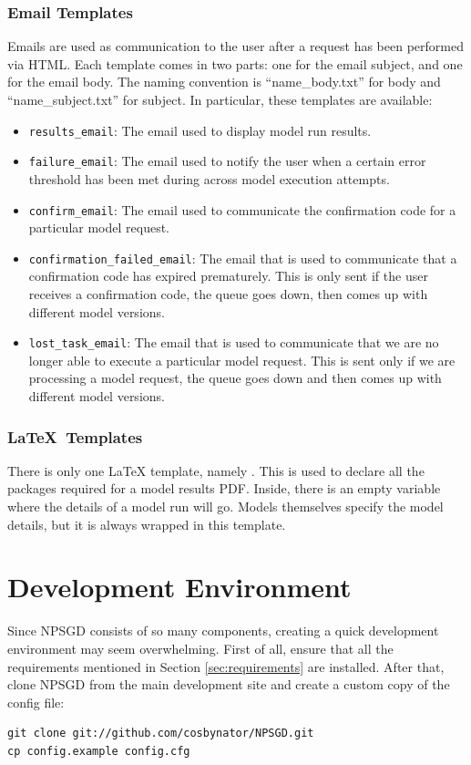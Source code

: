 \documentclass{article}
\begin{document}
\subsubsection{Email Templates}
Emails are used as communication to the user after a request has been performed
via HTML. Each template comes in two parts: one for the email subject, and one
for the email body. The naming convention is ``name\_body.txt'' for body and
``name\_subject.txt'' for subject. In particular, these templates are available:
\begin{itemize}
    \item \texttt{results\_email}: The email used to display model run results.
    \item \texttt{failure\_email}: The email used to notify the user when a
    certain error threshold has been met during across model execution attempts.
    \item \texttt{confirm\_email}: The email used to communicate the
    confirmation code for a particular model request.
    \item \texttt{confirmation\_failed\_email}: The email that is used to
    communicate that a confirmation code has expired prematurely. This is only
    sent if the user receives a confirmation code, the queue goes down, then
    comes up with different model versions.
    \item \texttt{lost\_task\_email}: The email that is used to communicate that
    we are no longer able to execute a particular model request. This is sent
    only if we are processing a model request, the queue goes down and then
    comes up with different model versions.
\end{itemize}

\subsubsection{\LaTeX\ Templates}
There is only one LaTeX template, namely . This is
used to declare all the packages required for a model results PDF. Inside, there
is an empty variable where the details of a model run will go. Models themselves
specify the model details, but it is always wrapped in this template.


\section{Development Environment}
Since NPSGD consists of so many components, creating a quick development
environment may seem overwhelming. First of all, ensure that all the 
requirements mentioned in Section \ref{sec:requirements} are installed. 
After that, clone NPSGD from the
main development site and create a custom copy of the config file:
\begin{verbatim}
git clone git://github.com/cosbynator/NPSGD.git
cp config.example config.cfg
\end{verbatim}
\end{document}
